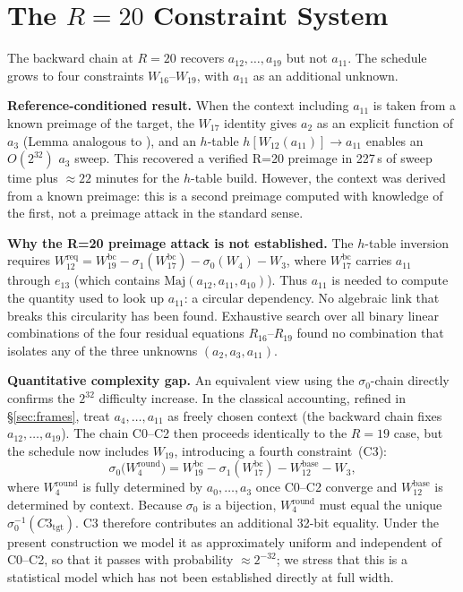 \documentclass[11pt,a4paper]{article}
\newcommand{\sig}[1]{\sigma_{#1}}
\newcommand{\Maj}{\mathrm{Maj}}
\begin{document}
\section{The \texorpdfstring{$R=20$}{R=20} Constraint System}
\label{sec:r20}

The backward chain at $R = 20$ recovers $a_{12},\ldots,a_{19}$ but
not $a_{11}$.  The schedule grows to four constraints
$W_{16}$--$W_{19}$, with $a_{11}$ as an additional unknown.

\textbf{Reference-conditioned result.}  When the context including $a_{11}$
is taken from a known preimage of the target, the $W_{17}$ identity
gives $a_2$ as an explicit function of $a_3$ (Lemma analogous to
\cite[Prop.~3]{Basra2026R19}), and an $h$-table $h[W_{12}(a_{11})]
\to a_{11}$ enables an $O(2^{32})$ $a_3$ sweep.  This recovered a
verified R=20 preimage in 227\,s of sweep time plus $\approx 22$
minutes for the $h$-table build.  However, the context was derived
from a known preimage: this is a second preimage computed with knowledge
of the first, not a preimage attack in the standard sense.

\textbf{Why the R=20 preimage attack is not established.}  The $h$-table
inversion requires $W_{12}^{\mathrm{req}} = W_{19}^{\mathrm{bc}} -
\sig{1}(W_{17}^{\mathrm{bc}}) - \sig{0}(W_4) - W_3$, where
$W_{17}^{\mathrm{bc}}$ carries $a_{11}$ through $e_{13}$
(which contains $\Maj(a_{12},a_{11},a_{10})$).  Thus $a_{11}$
is needed to compute the quantity used to look up $a_{11}$: a circular
dependency.  No algebraic link that breaks this circularity has been
found.  Exhaustive search over all binary linear combinations of the
four residual equations $R_{16}$--$R_{19}$ found no combination that
isolates any of the three unknowns $(a_2, a_3, a_{11})$.

\textbf{Quantitative complexity gap.}
An equivalent view using the $\sigma_0$-chain directly confirms the $2^{32}$ difficulty increase.
In the classical accounting, refined in \S\ref{sec:frames}, treat $a_4,\ldots,a_{11}$ as freely chosen context (the backward chain fixes $a_{12},\ldots,a_{19}$).
The chain C0--C2 then proceeds identically to the $R=19$ case, but the schedule now includes $W_{19}$,
introducing a fourth constraint~(C3):
\[
  \sig{0}\!\bigl(W_4^{\mathrm{round}}\bigr)
  = W_{19}^{\mathrm{bc}} - \sig{1}(W_{17}^{\mathrm{bc}}) - W_{12}^{\mathrm{base}} - W_3,
\]
where $W_4^{\mathrm{round}}$ is fully determined by $a_0,\ldots,a_3$ once C0--C2 converge and
$W_{12}^{\mathrm{base}}$ is determined by context.
Because $\sig{0}$ is a bijection, $W_4^{\mathrm{round}}$ must equal the unique $\sig{0}^{-1}(C3_{\mathrm{tgt}})$.
C3 therefore contributes an additional 32-bit equality.  Under the present
construction we model it as approximately uniform and independent of C0--C2, so
that it passes with probability $\approx 2^{-32}$; we stress that this is a
statistical model which has not been established directly at full width.
\end{document}
